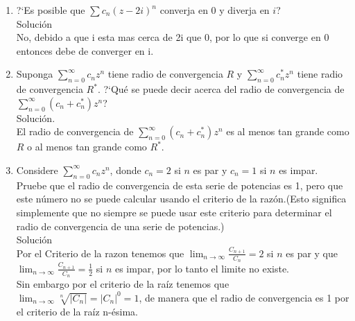 \documentclass[12pt,letterpaper]{article}
\begin{document}
\begin{enumerate}
\item ?`Es posible que $\sum c_{n}(z-2i)^n$ converja en 0 y diverja en $i$?\\
Soluci\'on\\
No, debido a que i esta mas cerca de 2i que 0, por lo que si converge en 0 entonces debe de converger en i.
\item Suponga $\sum\limits_{n=0}^\infty c_{n}z^n$ tiene radio de convergencia $R$ y $\sum\limits_{n=0}^\infty c_{n}^*z^n$ tiene radio de convergencia $R^*$. ?`Qu\'e se puede decir acerca del radio de convergencia de $\sum\limits_{n=0}^\infty(c_{n}+c_{n}^*)z^n$? \\
Soluci\'on.\\
El radio de convergencia de $\sum\limits_{n=0}^\infty(c_{n}+c_{n}^*)z^n$ es al menos tan grande como $R$ o al menos tan grande como $R^*$.
\item Considere $\sum\limits_{n=0}^\infty c_{n}z^n$, donde $c_{n}=2$  si $n$ es par y $c_{n}=1$ si $n$ es impar. Pruebe que el radio de convergencia de esta serie de potencias es 1, pero que este n\'umero no se puede calcular usando el criterio de la raz\'on.(Esto significa simplemente que no siempre se puede usar este criterio para determinar el radio de convergencia de una serie de potencias.)\\
Soluci\'on\\
Por el Criterio de la razon tenemos que  $\lim_{n \to \infty}\frac{C_{n+1}}{C_n} = 2$ si $n$ es par y que $\lim_{n \to \infty}\frac{C_{n+1}}{C_n}=\frac{1}{2}$ si $n$ es impar, por lo tanto el limite no existe.\\
Sin embargo por el criterio de la ra\'iz tenemos que $\lim_{n \to \infty} \sqrt[n]{|C_n|}=|C_n|^0= 1$, de manera que el radio de convergencia es 1 por el criterio de la ra\'iz n-\'esima.
\end{enumerate}
\end{document}
